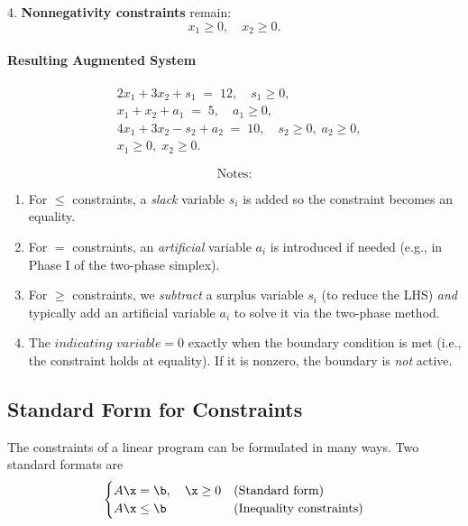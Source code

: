 4. \textbf{Nonnegativity constraints} remain:
\[
   x_{1} \ge 0,\quad x_{2} \ge 0.
\]

\paragraph{Resulting Augmented System}

\[
\begin{aligned}
&2x_{1} + 3x_{2} + s_{1} \;=\; 12, 
   \quad s_{1} \ge 0,\\
&x_{1} + x_{2} + a_{1} \;=\; 5, 
   \quad a_{1} \ge 0,\\
&4x_{1} + 3x_{2} - s_{2} + a_{2} \;=\; 10, 
   \quad s_{2} \ge 0,\; a_{2} \ge 0,\\
&x_{1} \ge 0,\; x_{2} \ge 0.
\end{aligned}
\]



\[
\text{Notes:}
\]
\begin{enumerate}
\item  For \(\le\) constraints, a \emph{slack} variable \(s_i\) is added so the constraint becomes an equality.  
\item  For \(=\) constraints, an \emph{artificial} variable \(a_i\) is introduced if needed (e.g., in Phase I of the two-phase simplex).  
\item For \(\ge\) constraints, we \emph{subtract} a surplus variable \(s_i\) (to reduce the LHS) \emph{and} typically add an artificial variable \(a_i\) to solve it via the two-phase method.  
\item  The \(\textit{indicating variable} = 0\) exactly when the boundary condition is met (i.e., the constraint holds at equality). If it is nonzero, the boundary is \textit{not} active.
\end{enumerate}





\subsection{Standard Form for Constraints}

The constraints of a linear program can be formulated in many ways.  Two standard formats are 
\begin{align*}
    \begin{cases}
        A\x = \b, \quad \x \geq 0 & \text{(Standard form)} \\
        A\x \leq\b& \text{(Inequality constraints)}
    \end{cases}
\end{align*}

